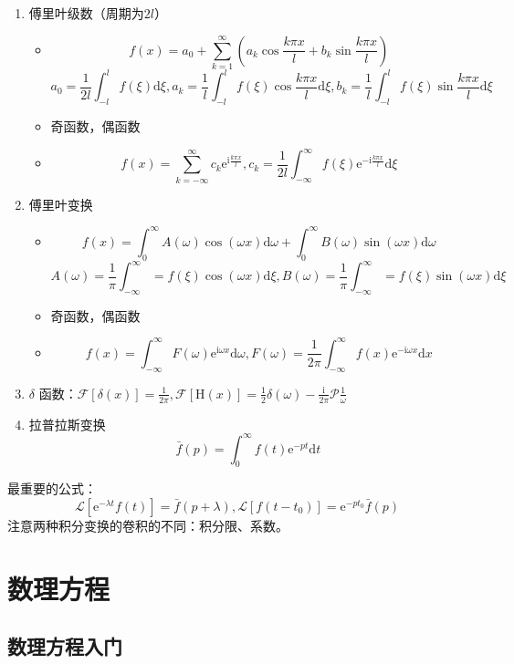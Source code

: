 \documentclass{article}
\begin{document}
\begin{enumerate}
    \item 傅里叶级数（周期为$2l$）\begin{itemize}
              \item $$f(x)=a_0+\sum^\infty_{k=1}(a_k\cos \frac{k\pi x}{l}+b_k\sin\frac{k\pi x}{l})$$ $$a_0=\frac{1}{2l}\int^l_{-l}f(\xi)\mathrm{d}\xi,a_k=\frac{1}{l}\int^l_{-l}f(\xi)\cos\frac{k\pi x}{l}\mathrm{d}\xi,b_k=\frac{1}{l}\int^l_{-l}f(\xi)\sin\frac{k\pi x}{l}\mathrm{d}\xi$$
              \item 奇函数，偶函数
              \item $$f(x)=\sum^\infty_{k=-\infty}c_k\mathrm{e}^{\mathrm{i}\frac{k\pi x}{l}},c_k=\frac{1}{2l}\int^\infty_{-\infty}f(\xi)\mathrm{e}^{-\mathrm{i}\frac{k\pi x}{l}}\mathrm{d}\xi$$
          \end{itemize}
    \item 傅里叶变换 \begin{itemize}
              \item $$f(x)=\int^\infty_0A(\omega)\cos(\omega x)\mathrm{d}\omega+\int^\infty_0B(\omega)\sin(\omega x)\mathrm{d}\omega$$ $$A(\omega)=\frac{1}{\pi}\int^\infty_{-\infty}=f(\xi)\cos(\omega x)\mathrm{d}\xi,B(\omega)=\frac{1}{\pi}\int^\infty_{-\infty}=f(\xi)\sin(\omega x)\mathrm{d}\xi$$
              \item 奇函数，偶函数
              \item $$f(x)=\int^\infty_{-\infty}F(\omega)\mathrm{e}^{\mathrm{i}\omega x}\mathrm{d}\omega,F(\omega)=\frac{1}{2\pi}\int^\infty_{-\infty}f(x)\mathrm{e}^{-\mathrm{i}\omega x}\mathrm{d}x$$
          \end{itemize}
    \item $\delta$ 函数：$\mathscr{F}[\delta(x)]=\frac{1}{2\pi},\mathscr{F}[\mathrm{H}(x)]=\frac{1}{2}\delta(\omega)-\frac{\mathrm{i}}{2\pi}\mathscr{P}\frac{1}{\omega}$
    \item 拉普拉斯变换 $$\bar f(p)=\int^\infty_0f(t)\mathrm{e}^{-pt}\mathrm{d}t$$
\end{enumerate}
最重要的公式：
$$\mathscr{L}[\mathrm{e}^{-\lambda t}f(t)]=\bar f(p+\lambda), \mathscr{L}[f(t-t_0)]=\mathrm{e}^{-pt_0}\bar{f}(p)$$
注意两种积分变换的卷积的不同：积分限、系数。

\section{数理方程}

\subsection{数理方程入门}
\end{document}
